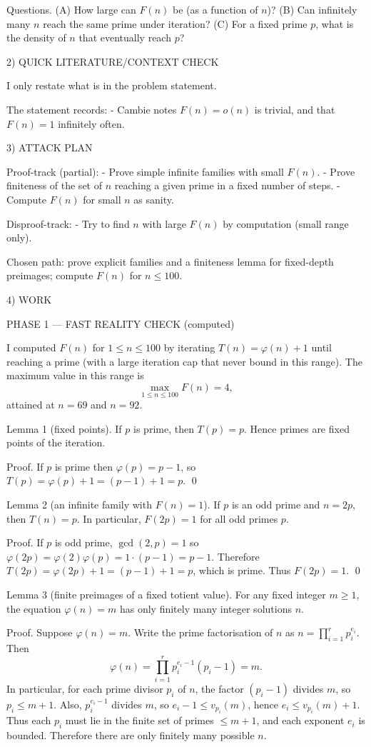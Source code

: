 Questions.
(A) How large can $F(n)$ be (as a function of $n$)?
(B) Can infinitely many $n$ reach the same prime under iteration?
(C) For a fixed prime $p$, what is the density of $n$ that eventually reach $p$?

2) QUICK LITERATURE/CONTEXT CHECK

I only restate what is in the problem statement.

The statement records:
- Cambie notes $F(n)=o(n)$ is trivial, and that $F(n)=1$ infinitely often.

3) ATTACK PLAN

Proof-track (partial):
- Prove simple infinite families with small $F(n)$.
- Prove finiteness of the set of $n$ reaching a given prime in a fixed number of steps.
- Compute $F(n)$ for small $n$ as sanity.

Disproof-track:
- Try to find $n$ with large $F(n)$ by computation (small range only).

Chosen path: prove explicit families and a finiteness lemma for fixed-depth preimages; compute $F(n)$ for $n\le 100$.

4) WORK

PHASE 1 — FAST REALITY CHECK (computed)

I computed $F(n)$ for $1\le n\le 100$ by iterating $T(n)=\varphi(n)+1$ until reaching a prime (with a large iteration cap that never bound in this range).
The maximum value in this range is
\[
\max_{1\le n\le 100} F(n)=4,
\]
attained at $n=69$ and $n=92$.

Lemma 1 (fixed points).
If $p$ is prime, then $T(p)=p$. Hence primes are fixed points of the iteration.

Proof.
If $p$ is prime then $\varphi(p)=p-1$, so $T(p)=\varphi(p)+1=(p-1)+1=p$. \qed

Lemma 2 (an infinite family with $F(n)=1$).
If $p$ is an odd prime and $n=2p$, then $T(n)=p$. In particular, $F(2p)=1$ for all odd primes $p$.

Proof.
If $p$ is odd prime, $\gcd(2,p)=1$ so $\varphi(2p)=\varphi(2)\varphi(p)=1\cdot(p-1)=p-1$.
Therefore $T(2p)=\varphi(2p)+1=(p-1)+1=p$, which is prime. Thus $F(2p)=1$. \qed

Lemma 3 (finite preimages of a fixed totient value).
For any fixed integer $m\ge 1$, the equation $\varphi(n)=m$ has only finitely many integer solutions $n$.

Proof.
Suppose $\varphi(n)=m$.
Write the prime factorisation of $n$ as $n=\prod_{i=1}^r p_i^{e_i}$.
Then
\[
\varphi(n)=\prod_{i=1}^r p_i^{e_i-1}(p_i-1)=m.
\]
In particular, for each prime divisor $p_i$ of $n$, the factor $(p_i-1)$ divides $m$, so $p_i\le m+1$.
Also, $p_i^{e_i-1}$ divides $m$, so $e_i-1\le v_{p_i}(m)$, hence $e_i\le v_{p_i}(m)+1$.
Thus each $p_i$ must lie in the finite set of primes $\le m+1$, and each exponent $e_i$ is bounded.
Therefore there are only finitely many possible $n$.

